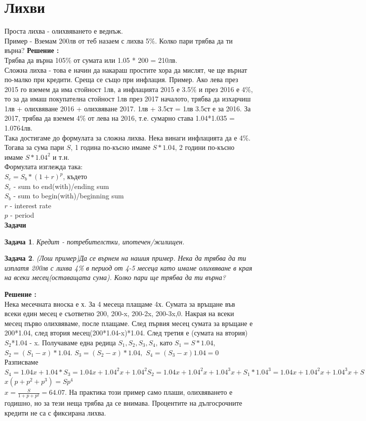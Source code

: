 \documentclass{article}
\newtheorem{problem}{Задача}
\newcounter{solution}
\newcommand\solution{%
	\stepcounter{solution}%
	\textbf{Решение :}\\%
}
\begin{document}
\section{Лихви}
Проста лихва - олихвяването е веднъж. \\
Пример - Вземам 200лв  от теб назаем с лихва 5\%. Колко пари трябва да ти върна?
\solution
Трябва да върна 105\% от сумата или 1.05 * 200 = 210лв. \\
Сложна  лихва - това е начин да накараш простите хора да мислят, че ще върнат по-малко при кредити. Среща се също при инфлация.
Пример. Ако лева през 2015 го вземем да има стойност 1лв, а инфлацията 2015 е 3.5\% и през 2016 е 4\%, то за да имаш покупателна стойност 1лв през 2017 началото, трябва да изхарчиш 1лв + олихвяване 2016 + олихвяване 2017. 1лв + 3.5ст = 1лв 3.5ст е за 2016. За 2017, трябва да вземем 4\% от лева на 2016, т.е. сумарно става 1.04*1.035 = 1.0764лв. \\
Така достигаме до формулата за сложна лихва. Нека винаги инфлацията да е 4\%. Тогава за сума пари $S$, 1 година по-късно имаме $S*1.04$, 2 години по-късно имаме $S*1.04^2$ и т.н. \\
Формулата изглежда така: \\ $S_e = S_b*(1+r)^p $, където\\
$S_e$ - sum to end(with)/ending sum \\
$S_b$ -  sum to begin(with)/beginning sum\\
$r$ - interest rate \\
$p$ - period \\

\textbf{Задачи}
\begin{problem}
	Кредит - потребителстки, ипотечен/жилищен.

\end{problem}
\begin{problem}
	
	(Лош пример)Да се върнем на нашия пример. Нека да трябва да ти изплатя 200лв с лихва 4\% в период от 4-5 месеца като имаме олихвяване в края на всеки месец(оставащата сума). Колко пари ще трябва да ти върна? 
\end{problem}

\solution 
Нека месечната вноска е х. За 4 месеца плащаме 4х. Сумата за връщане във всеки един месец е съответно 200, 200-x, 200-2x, 200-3x,0. Накрая на всеки месец първо олихвяваме, после плащаме. След първия месец сумата за връщане е 200*1.04, след втория месец(200*1.04-x)*1.04. След третия е (сумата на втория)$S_2$*1.04 - x. Получаваме една редица
$S_1, S_2, S_3, S_4 $, като $S_1 = S*1.04$, $S_2 = (S_1-x)*1.04$. $S_3 = (S_2-x)*1.04,$ $ S_4 = (S_3 -x)1.04 = 0 $
Разписваме $S_4 = 1.04x + 1.04*S_3 = 1.04x + 1.04^2x + 1.04^2 S_2 = 1.04x + 1.04^2x + 1.04^3x + S_1*1.04^3 =1.04x + 1.04^2x + 1.04^3x + S*1.04^4 =0  $ \\
$x(p+p^2+p^3) = Sp^4$ \\
$x = \frac{S}{1+p+p^2} = 64.07 $.
На практика този пример само плаши, олихвяването е годишно, но за тези неща трябва да се внимава. Процентите на дългосрочните кредити не са с фиксирана лихва.
\end{document}
